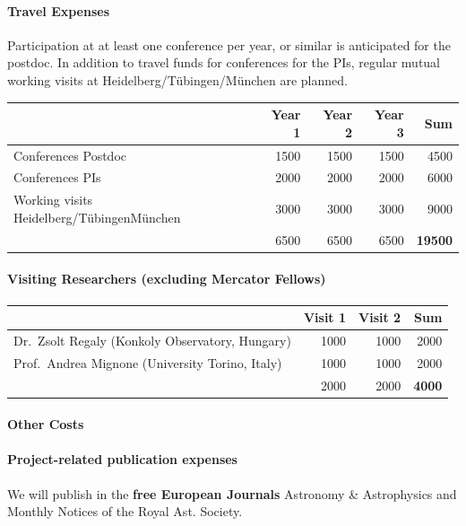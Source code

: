\documentclass[10pt,fleqn,twoside]{article}
\begin{document}
\paragraph{Travel Expenses}
Participation at at least one conference per year, or similar is anticipated
for the postdoc. In addition to travel funds for conferences for the PIs,
regular mutual working visits at Heidelberg/T\"ubingen/M\"unchen are
planned.

\begin{center}
\begin{tabular}{l|r|r|r|r}
& Year 1 & Year 2 & Year 3 & Sum \\
\hline\hline
Conferences Postdoc                       	& 1500	& 1500 & 1500 & 4500\\
Conferences PIs                                 & 2000	& 2000 & 2000 & 6000\\
Working visits Heidelberg/T\"ubingenM\"unchen   & 3000	& 3000 & 3000 & 9000\\
\hline
  & 6500 & 6500 & 6500 & {\bf 19500}\\
\end{tabular}
\end{center}

\paragraph{Visiting Researchers (excluding Mercator Fellows)}

\begin{center}
\begin{tabular}{l|r|r|r}
& Visit 1 & Visit 2 & Sum \\
\hline\hline
Dr.\ Zsolt Regaly (Konkoly Observatory, Hungary)  & 1000 & 1000 & 2000 \\
Prof.\ Andrea Mignone (University Torino, Italy)  & 1000 & 1000 & 2000 \\
\hline
  & 2000 & 2000 & {\bf 4000}\\
\end{tabular}
\end{center}

\paragraph{Other Costs}

\paragraph{Project-related publication expenses}
We will publish in the {\bf free European Journals} Astronomy \& Astrophysics and Monthly Notices of the Royal Ast. Society.
\end{document}
